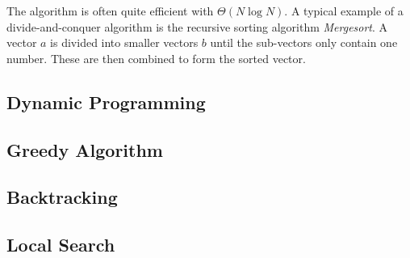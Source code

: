 The algorithm is often quite efficient with $\Theta(N\log N)$. A typical example of a divide-and-conquer algorithm is the recursive sorting algorithm \emph{Mergesort}. A vector $a$ is divided into smaller vectors $b$ until the sub-vectors only contain one number. These are then combined to form the sorted vector.

%

\subsection{Dynamic Programming}

%

\subsection{Greedy Algorithm}

%

\subsection{Backtracking}

%

\subsection{Local Search}

%